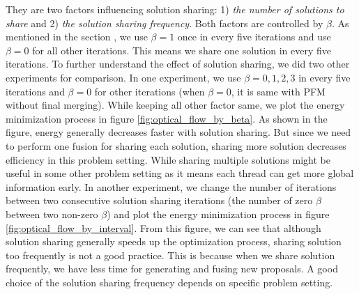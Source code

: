 They are two factors influencing solution sharing: 1) \textit{the number of solutions to share} and 2) \textit{the solution sharing frequency}. Both factors are controlled by $\beta$. As mentioned in the section \label{optical_flow}, we use $\beta = 1$ once in every five iterations and use $\beta = 0$ for all other iterations. This means we share one solution in every five iterations. To further understand the effect of solution sharing, we did two other experiments for comparison. In one experiment, we use $\beta = {0, 1, 2, 3}$ in every five iterations and $\beta = 0$ for other iterations (when $\beta = 0$, it is same with PFM without final merging). While keeping all other factor same, we plot the energy minimization process in figure \ref{fig:optical_flow_by_beta}. As shown in the figure, energy generally decreases faster with solution sharing. But since we need to perform one fusion for sharing each solution, sharing more solution decreases efficiency in this problem setting. While sharing multiple solutions might be useful in some other problem setting as it means each thread can get more global information early. In another experiment, we change the number of iterations between two consecutive solution sharing iterations (the number of zero $\beta$ between two non-zero $\beta$) and plot the energy minimization process in figure \ref{fig:optical_flow_by_interval}. From this figure, we can see that although solution sharing generally speeds up the optimization process, sharing solution too frequently is not a good practice. This is because when we share solution frequently, we have less time for generating and fusing new proposals. A good choice of the solution sharing frequency depends on specific problem setting.


